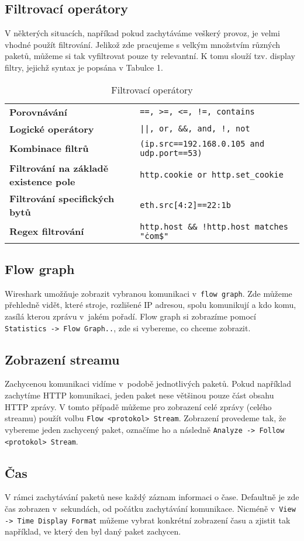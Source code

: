 \subsection{Filtrovací operátory}
V některých situacích, napříkad pokud zachytáváme veškerý provoz, je velmi vhodné použít filtrování. Jelikož zde pracujeme s velkým množstvím různých paketů, můžeme si tak vyfiltrovat pouze ty relevantní. K tomu slouží tzv. display filtry, jejichž syntax je popsána v Tabulce 1.
\begin{center}
\begin{table}[h]
\centering
\def\arraystretch{1.2}
\begin{tabular}{|l|l|}
\hline
\textbf{Porovnávání} & \texttt{==, >=, <=, !=, contains}\\
\textbf{Logické operátory} & \texttt{||, or, \&\&, and, !, not}\\
\textbf{Kombinace filtrů} & \texttt{(ip.src==192.168.0.105 and udp.port==53)}\\
\textbf{Filtrování na základě existence pole} & \texttt{http.cookie or http.set\_cookie}\\
\textbf{Filtrování specifických bytů} & \texttt{eth.src[4:2]==22:1b}\\
\textbf{Regex filtrování} & \texttt{http.host \&\& !http.host matches "\.com\$"}\\
\hline
\end{tabular}
\caption{Filtrovací operátory}
\end{table}
\end{center}


\subsection{Flow graph}
Wireshark umožňuje zobrazit vybranou komunikaci v~\texttt{flow graph}. Zde můžeme přehledně vidět, které stroje, rozlišené IP adresou, spolu komunikují a kdo komu, zasílá kterou zprávu v~jakém pořadí.
Flow graph si zobrazíme pomocí \texttt{Statistics -> Flow Graph..}, zde si vybereme, co chceme zobrazit.
\subsection{Zobrazení streamu}
Zachycenou komunikaci vidíme v~podobě jednotlivých paketů. Pokud například zachytíme HTTP komunikaci, jeden paket nese většinou pouze část obsahu HTTP zprávy. V tomto případě můžeme pro zobrazení celé zprávy (celého streamu) použít volbu \texttt{Flow <protokol> Stream}. Zobrazení provedeme tak, že vybereme jeden zachycený paket, označíme ho a následně \texttt{Analyze -> Follow <protokol> Stream}.
\subsection{Čas}
V rámci zachytávání paketů nese každý záznam informaci o čase. Defaultně je zde čas zobrazen v~sekundách, od počátku zachytávání komunikace. Nicméně v~\texttt{View -> Time Display Format} můžeme vybrat konkrétní zobrazení času a zjistit tak například, ve který den byl daný paket zachycen.

